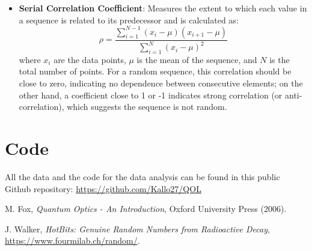\documentclass[prl,twocolumn]{revtex4-1}
\begin{document}
\begin{itemize}
    \item \textbf{Serial Correlation Coefficient}: Measures the extent to which each value in a sequence is related to its predecessor and is calculated as:
    \begin{equation}
        \rho = \frac{\sum_{i=1}^{N-1} (x_i - \mu)(x_{i+1} - \mu)}{\sum_{i=1}^{N} (x_i - \mu)^2}
    \end{equation}
    where $x_i$ are the data points, $\mu$ is the mean of the sequence, and $N$ is the total number of points.  For a random sequence, this correlation should be close to zero, indicating no dependence between consecutive elements; on the other hand, a coefficient close to 1 or -1 indicates strong correlation (or anti-correlation), which suggests the sequence is not random.
\end{itemize}

\section{Code}
All the data and the code for the data analysis can be found in this public Github repository: \href{https://github.com/Kallo27/QOL}{https://github.com/Kallo27/QOL}

\begin{thebibliography}{99}

  M. Fox, \textit{Quantum Optics - An Introduction}, Oxford University Press (2006).

  J. Walker, \textit{HotBits: Genuine Random Numbers from Radioactive Decay}, \href{https://www.fourmilab.ch/random/}{https://www.fourmilab.ch/random/}.

\end{thebibliography}
\end{document}
